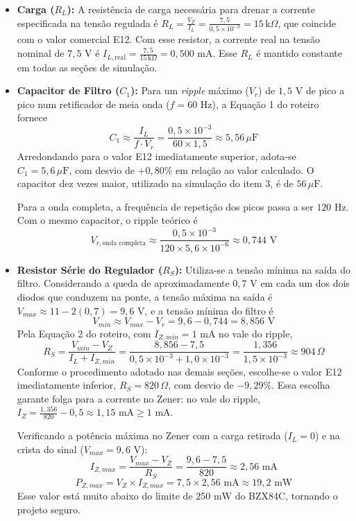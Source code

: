 \documentclass[11pt,a4paper]{article}
\begin{document}
\begin{itemize}

    \item \textbf{Carga ($R_L$):}
    A resistência de carga necessária para drenar a corrente especificada na tensão regulada é $R_L = \frac{V_Z}{I_L} = \frac{7{,}5}{0{,}5 \times 10^{-3}} = 15\,\mathrm{k}\Omega$, que coincide com o valor comercial E12. Com esse resistor, a corrente real na tensão nominal de $7{,}5\text{ V}$ é $I_{L,\text{real}} = \frac{7{,}5}{15\,\mathrm{k}\Omega} = 0{,}500\text{ mA}$. Esse $R_L$ é mantido constante em todas as seções de simulação.

    \item \textbf{Capacitor de Filtro ($C_1$):}
    Para um \textit{ripple} máximo ($V_r$) de $1{,}5\text{ V}$ de pico a pico num retificador de meia onda ($f = 60\text{ Hz}$), a Equação 1 do roteiro fornece
    \[
    C_1 \approx \frac{I_L}{f \cdot V_r} = \frac{0{,}5 \times 10^{-3}}{60 \times 1{,}5} \approx 5{,}56\,\mu\text{F}
    \]
    Arredondando para o valor E12 imediatamente superior, adota-se $C_1 = 5{,}6\,\mu\text{F}$, com desvio de $+0{,}80\%$ em relação ao valor calculado. O capacitor dez vezes maior, utilizado na simulação do item 3, é de $56\,\mu\text{F}$.

    Para a onda completa, a frequência de repetição dos picos passa a ser $120\text{ Hz}$. Com o mesmo capacitor, o ripple teórico é
    \[
    V_{r,\text{onda completa}} \approx \frac{0{,}5 \times 10^{-3}}{120 \times 5{,}6 \times 10^{-6}} \approx 0{,}744\text{ V}
    \]

    \item \textbf{Resistor Série do Regulador ($R_S$):}
    Utiliza-se a tensão mínima na saída do filtro. Considerando a queda de aproximadamente $0{,}7\text{ V}$ em cada um dos dois diodos que conduzem na ponte, a tensão máxima na saída é $V_{max} \approx 11 - 2(0{,}7) = 9{,}6\text{ V}$, e a tensão mínima do filtro é
    \[
    V_{min} \approx V_{max} - V_r = 9{,}6 - 0{,}744 = 8{,}856\text{ V}
    \]
    Pela Equação 2 do roteiro, com $I_{Z,min} = 1\text{ mA}$ no vale do ripple,
    \[
    R_S = \frac{V_{min} - V_Z}{I_L + I_{Z,min}} = \frac{8{,}856 - 7{,}5}{0{,}5 \times 10^{-3} + 1{,}0 \times 10^{-3}} = \frac{1{,}356}{1{,}5 \times 10^{-3}} \approx 904\,\Omega
    \]
    Conforme o procedimento adotado nas demais seções, escolhe-se o valor E12 imediatamente inferior, $R_S = 820\,\Omega$, com desvio de $-9{,}29\%$. Essa escolha garante folga para a corrente no Zener: no vale do ripple, $I_Z = \frac{1{,}356}{820} - 0{,}5 \approx 1{,}15\text{ mA} \geq 1\text{ mA}$.

    Verificando a potência máxima no Zener com a carga retirada ($I_L = 0$) e na crista do sinal ($V_{max} = 9{,}6\text{ V}$):
    \[
    I_{Z,max} = \frac{V_{max} - V_Z}{R_S} = \frac{9{,}6 - 7{,}5}{820} \approx 2{,}56\text{ mA}
    \]
    \[
    P_{Z,max} = V_Z \times I_{Z,max} = 7{,}5 \times 2{,}56\text{ mA} \approx 19{,}2\text{ mW}
    \]
    Esse valor está muito abaixo do limite de $250\text{ mW}$ do BZX84C, tornando o projeto seguro.

\end{itemize}
\end{document}
